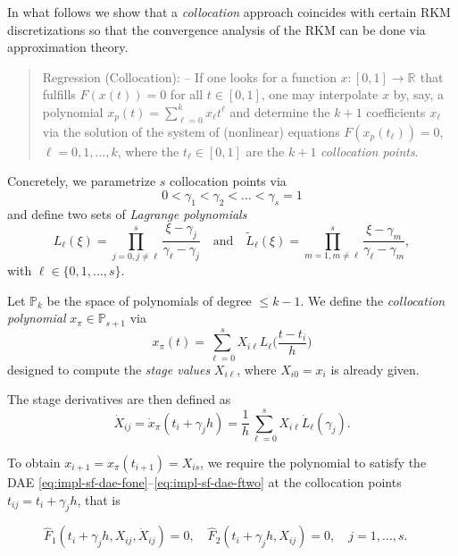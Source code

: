 \documentclass[]{book}
\theoremstyle{definition}
\theoremstyle{definition}
\theoremstyle{definition}
\theoremstyle{definition}
\theoremstyle{remark}
\begin{document}
In what follows we show that a \emph{collocation} approach coincides with certain RKM discretizations so that the convergence analysis of the RKM can be done via approximation theory.

\begin{quote}
Regression (Collocation): -- If one looks for a function \(x\colon [0,1] \to \mathbb R^{}\) that fulfills \(F(x(t))=0\) for all \(t\in[0,1]\), one may interpolate \(x\) by, say, a polynomial \(x_p(t) = \sum_{\ell=0}^kx_\ell t^\ell\) and determine the \(k+1\) coefficients \(x_\ell\) via the solution of the system of (nonlinear) equations \(F(x_p(t_\ell))=0\), \(\ell=0,1,\dotsc,k\), where the \(t_\ell\in[0,1]\) are the \(k+1\) \emph{collocation points}.
\end{quote}

Concretely, we parametrize \(s\) collocation points via
\begin{equation}
0< \gamma_1 <\gamma_2< \dotsc < \gamma_s=1 \label{eq:rkm-collo-gamma}
\end{equation}
and define two sets of \emph{Lagrange polynomials}
\[
L_\ell(\xi) = \prod_{j=0,j\neq \ell}^s \frac{\xi-\gamma_j}{\gamma_\ell-\gamma_j}
\quad\text{and}\quad
\tilde L_\ell(\xi) = \prod_{m=1,m\neq \ell}^s \frac{\xi-\gamma_m}{\gamma_\ell-\gamma_m},
\]
with \(\ell\in\{0,1,\dotsc,s\}\).

Let \(\mathbb P_k\) be the space of polynomials of degree \(\leq k-1\). We define the \emph{collocation polynomial} \(x_\pi \in \mathbb P_{s+1}\) via
\begin{equation}
x_\pi (t) = \sum_{\ell=0}^s X_{i\ell}L_\ell\bigl(\frac{t-t_i}{h}\bigr)
\label{eq:rkm-coll-collpol}
\end{equation}
designed to compute the \emph{stage values} \(X_{i\ell}\), where \(X_{i0}=x_i\) is already given.

The stage derivatives are then defined as
\begin{equation}
\dot X_{ij} = \dot x_\pi(t_i+\gamma_jh) = \frac 1h \sum_{\ell=0}^sX_{i\ell}\dot L_\ell(\gamma_j). \label{eq:rkm-coll-staged}
\end{equation}

To obtain \(x_{i+1}=x_\pi(t_{i+1})=X_{is}\), we require the polynomial to satisfy the DAE \eqref{eq:impl-sf-dae-fone}--\eqref{eq:impl-sf-dae-ftwo} at the collocation points \(t_{ij}=t_i+\gamma_jh\), that is

\begin{equation}
\hat F_1(t_i+\gamma_jh,X_{ij},\dot X_{ij}) = 0, \quad \hat F_2(t_i+\gamma_jh,X_{ij}) = 0, \quad j=1,\dotsc,s. \phantom{F_1} \label{eq:impl-sf-dae-collo}
\end{equation}
\end{document}
